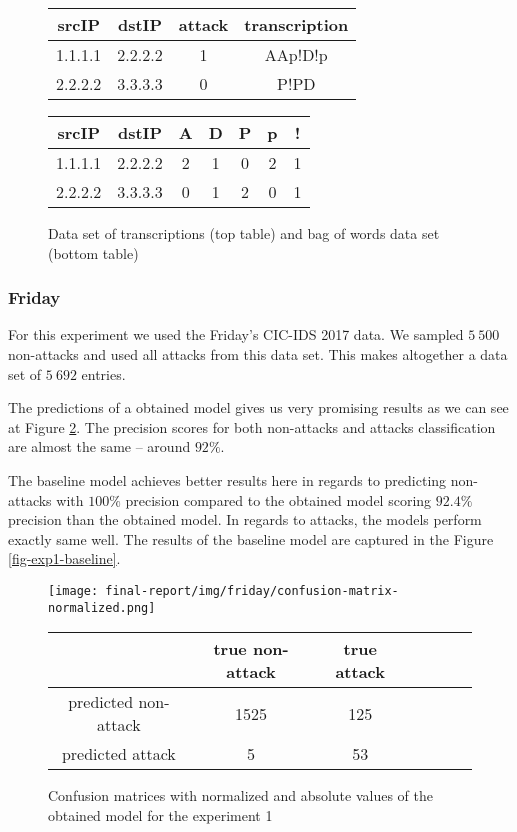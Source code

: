 \documentclass{article}
\begin{document}
\begin{figure}[h!]
\centering
\begin{tabular}{ |c|c|c|c| }
 \hline
 srcIP & dstIP & attack & transcription \\
 \hline
 1.1.1.1 & 2.2.2.2 & 1 & AAp!D!p \\
 2.2.2.2 & 3.3.3.3 & 0 & P!PD \\
 \hline
\end{tabular}

\vspace{0.3cm}

\begin{tabular}{ |c|c|c|c|c|c|c| }
 \hline
 srcIP & dstIP & A & D & P & p & ! \\
 \hline
 1.1.1.1 & 2.2.2.2 & 2 & 1 & 0 & 2 & 1 \\
 2.2.2.2 & 3.3.3.3 & 0 & 1 & 2 & 0 & 1 \\
 \hline
\end{tabular}
\caption{Data set of transcriptions (top table) and bag of words data set (bottom table)}
\label{fig-bag-of-words-example}
\end{figure}


\clearpage

\subsubsection{Friday}

For this experiment we used the Friday's CIC-IDS 2017 data. We sampled $5\ 500$ non-attacks and used all attacks from this data set. This makes altogether a data set of $5\ 692$ entries.

The predictions of a obtained model gives us very promising results as we can see at Figure \ref{fig-exp1-obtained-model}. The precision scores for both non-attacks and attacks classification are almost the same -- around $92\%$.

The baseline model achieves better results here in regards to predicting non-attacks with $100\%$ precision compared to the obtained model scoring $92.4\%$ precision than the obtained model. In regards to attacks, the models perform exactly same well. The results of the baseline model are captured in the Figure \ref{fig-exp1-baseline}.

\begin{figure}[h!]
    \centering
    \texttt{[image: final-report/img/friday/confusion-matrix-normalized.png]}

    \centering
    \begin{tabular}{ |c|c|c|c|c|c|c| }
     \hline
      & true non-attack & true attack \\
     \hline
     predicted non-attack & 1525 & 125 \\
     \hline
     predicted attack & 5 & 53 \\
     \hline
    \end{tabular}

    \caption{Confusion matrices with normalized and absolute values of the obtained model for the experiment 1}
    \label{fig-exp1-obtained-model}
\end{figure}
\end{document}
